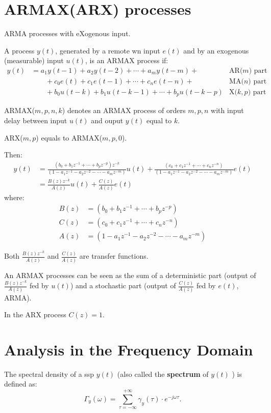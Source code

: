 \section{ARMAX(ARX) processes}
ARMA processes with eXogenous input.

A process $y(t)$, generated by a remote \gls{wn} input $e(t)$ and by an exogenous (measurable) input $u(t)$, is an ARMAX process if:
\begin{align*}
	y(t)&=a_{1} y(t-1)+a_{2} y(t-2)+\cdots+a_{m} y(t-m)+ &\text{AR($m$) part}\\
	&\qquad+c_{0} e(t)+c_{1} e(t-1)+\cdots+c_{n} e(t-n)+ &\text{MA($n$) part} \\
	&\qquad+b_{0} u(t-k)+b_{1} u(t-k-1)+\cdots+b_{p} u(t-k-p)  &\text{X($k,p$) part}
\end{align*}

ARMAX($m,p,n,k$) denotes an ARMAX process of orders $m,p,n$ with input delay between input $u(t)$ and ouput $y(t)$ equal to $k$.

ARX($m,p$) equals to ARMAX($m,p,0$).

Then:
\begin{align*}
	y(t) &= \frac{\left(b_{0}+b_{1} z^{-1}+\cdots+b_{p} z^{-p}\right) z^{-k}}{\left(1-a_{1} z^{-1}-a_{2} z^{-2}-\cdots-a_{m} z^{-m}\right)} u(t)+\frac{\left(c_{0}+c_{1} z^{-1}+\cdots+c_{n} z^{-n}\right)}{\left(1-a_{1} z^{-1}-a_{2} z^{-2}-\cdots-a_{m} z^{-m}\right)} e(t)\\
	&=\frac{B(z) z^{-k}}{A(z)} u(t)+\frac{C(z)}{A(z)} e(t)
\end{align*}
where:
\begin{align*}
	B(z) &= \left(b_{0}+b_{1} z^{-1}+\cdots+b_{p} z^{-p}\right)\\
	C(z) &= \left(c_{0}+c_{1} z^{-1}+\cdots+c_{n} z^{-n}\right)\\
	A(z) &= \left(1-a_{1} z^{-1}-a_{2} z^{-2}-\cdots-a_{m} z^{-m}\right)
\end{align*}

Both $\frac{B(z) z^{-k}}{A(z)}$ and $\frac{C(z)}{A(z)}$ are transfer functions.

An ARMAX processes can be seen as the sum of a deterministic part (output of $\frac{B(z) z^{-k}}{A(z)}$ fed by $u(t)$) and a stochastic part (output of $\frac{C(z)}{A(z)}$ fed by $e(t)$, ARMA).

In the ARX process $C(z)=1$.

\section{Analysis in the Frequency Domain}
\begin{definition}
	The spectral density of a \gls{ssp} $y(t)$ (also called the \textbf{spectrum} of $y(t)$ ) is defined as:
	\[
		\Gamma_{y}(\omega)=\sum_{\tau=-\infty}^{+\infty} \gamma_{y}(\tau) \cdot e^{-j \omega \tau}.
	\]
\end{definition}

